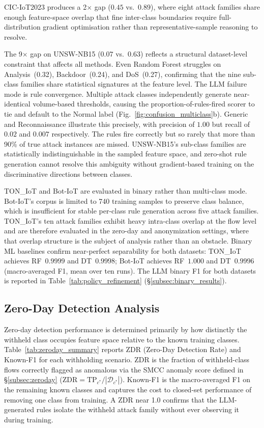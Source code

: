 CIC-IoT2023 produces a 2$\times$ gap ($0.45$ vs.\ $0.89$), where eight attack families share enough feature-space overlap that fine inter-class boundaries require full-distribution gradient optimisation rather than representative-sample reasoning to resolve.

The 9$\times$ gap on UNSW-NB15 ($0.07$ vs.\ $0.63$) reflects a structural dataset-level constraint that affects all methods. Even Random Forest struggles on Analysis~(0.32), Backdoor~(0.24), and DoS~(0.27), confirming that the nine sub-class families share statistical signatures at the feature level. The LLM failure mode is rule convergence. Multiple attack classes independently generate near-identical volume-based thresholds, causing the proportion-of-rules-fired scorer to tie and default to the Normal label (Fig.~\ref{fig:confusion_multiclass}b). Generic and Reconnaissance illustrate this precisely, with precision of $1.00$ but recall of $0.02$ and $0.007$ respectively. The rules fire correctly but so rarely that more than 90\% of true attack instances are missed. UNSW-NB15's sub-class families are statistically indistinguishable in the sampled feature space, and zero-shot rule generation cannot resolve this ambiguity without gradient-based training on the discriminative directions between classes.

TON\_IoT and Bot-IoT are evaluated in binary rather than multi-class mode. Bot-IoT's corpus is limited to 740 training samples to preserve class balance, which is insufficient for stable per-class rule generation across five attack families. TON\_IoT's ten attack families exhibit heavy intra-class overlap at the flow level and are therefore evaluated in the zero-day and anonymization settings, where that overlap structure is the subject of analysis rather than an obstacle. Binary ML baselines confirm near-perfect separability for both datasets: TON\_IoT achieves RF~$0.9999$ and DT~$0.9998$; Bot-IoT achieves RF~$1.000$ and DT~$0.9996$ (macro-averaged F1, mean over ten runs). The LLM binary F1 for both datasets is reported in Table~\ref{tab:policy_refinement} (\S\ref{subsec:binary_results}).

\subsection{Zero-Day Detection Analysis}
\label{subsec:zeroday_results}

Zero-day detection performance is determined primarily by how distinctly the withheld class occupies feature space relative to the known training classes. Table~\ref{tab:zeroday_summary} reports ZDR (Zero-Day Detection Rate) and Known-F1 for each withholding scenario. ZDR is the fraction of withheld-class flows correctly flagged as anomalous via the SMCC anomaly score defined in \S\ref{subsec:zeroday} ($\mathrm{ZDR} = \mathrm{TP}_{c^*} / |\mathcal{D}_{c^*}|$). Known-F1 is the macro-averaged F1 on the remaining known classes and captures the cost to closed-set performance of removing one class from training. A ZDR near 1.0 confirms that the LLM-generated rules isolate the withheld attack family without ever observing it during training.

